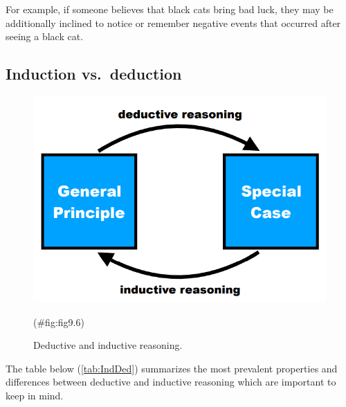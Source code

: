 \documentclass[
]{krantz}
\begin{document}
For example, if someone believes that black cats bring bad luck, they may be additionally inclined to notice or remember negative events that occurred after seeing a black cat.

\hypertarget{induction-vs.-deduction}{%
\subsection*{Induction vs.~deduction}\label{induction-vs.-deduction}}


\begin{figure}

{\centering \includegraphics[width=0.6\linewidth]{images/ch9/fig6} 

}

\caption{Deductive and inductive reasoning.}(\#fig:fig9.6)
\end{figure}

The table below (\ref{tab:IndDed}) summarizes the most prevalent properties and differences between deductive and inductive reasoning which are important to keep in mind.
\end{document}
